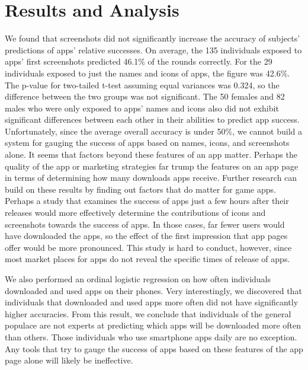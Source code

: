 \section{Results and Analysis}


We found that screenshots did not significantly increase the accuracy of subjects' predictions of apps' relative successes. On average, the 135 individuals exposed to apps' first screenshots predicted 46.1\% of the rounds correctly. For the 29 individuals exposed to just the names and icons of apps, the figure was 42.6\%. The p-value for two-tailed t-test assuming equal variances was 0.324, so the difference between the two groups was not significant. The 50 females and 82 males who were only exposed to apps' names and icons also did not exhibit significant differences between each other in their abilities to predict app success. \\

Unfortunately, since the average overall accuracy is under 50\%, we cannot build a system for gauging the success of apps based on names, icons, and screenshots alone. It seems that factors beyond these features of an app matter. Perhaps the quality of the app or marketing strategies far trump the features on an app page in terms of determining how many downloads apps receive. Further research can build on these results by finding out factors that do matter for game apps. Perhaps a study that examines the success of apps just a few hours after their releases would more effectively determine the contributions of icons and screenshots towards the success of apps. In those cases, far fewer users would have downloaded the apps, so the effect of the first impression that app pages offer would be more pronounced. This study is hard to conduct, however, since most market places for apps do not reveal the specific times of release of apps.

We also performed an ordinal logistic regression on how often individuals downloaded and used apps on their phones. Very interestingly, we discovered that individuals that downloaded and used apps more often did not have significantly higher accuracies. From this result, we conclude that individuals of the general populace are not experts at predicting which apps will be downloaded more often than others. Those individuals who use smartphone apps daily are no exception. Any tools that try to gauge the success of apps based on these features of the app page alone will likely be ineffective. \\
